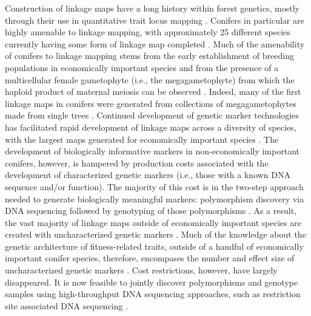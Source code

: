 \documentclass[smallextended]{svjour3}
\begin{document}
Construction of linkage maps have a long history within forest genetics, mostly
through their use in quantitative trait locus mapping
\citep{Ritland:2011}. Conifers in particular are highly amenable to linkage
mapping, with approximately 25 different species currently having some form of
linkage map completed \citep[see Table 5-1 in][]{Ritland:2011}. Much of the
amenability of conifers to linkage mapping stems from the early establishment of
breeding populations in economically important species and from the presence of
a multicellular female gametophyte (i.e., the megagametophyte) from which the
haploid product of maternal meiosis can be observed
\citep{Cairney:2007}. Indeed, many of the first linkage maps in conifers were
generated from collections of megagametophytes made from single trees
\citep{Tulsieram:1992, Nelson:1993, Kubisiak:1996}. Continued development of
genetic marker technologies has facilitated rapid development of linkage maps
across a diversity of species, with the largest maps generated for economically
important species \citep[e.g.][] {Achere:2004, Kang:2010, Martinez-Garcia:2013}.
The development of biologically informative markers in non-economically
important conifers, however, is hampered by production costs associated with the
development of characterized genetic markers (i.e., those with a known DNA
sequence and/or function).  The majority of this cost is in the two-step
approach needed to generate biologically meaningful markers: polymorphism
discovery via DNA sequencing followed by genotyping of those polymorphisms
\citep[cf.,][]{Eckert:2013a}. As a result, the vast majority of linkage maps
outside of economically important species are created with uncharacterized
genetic markers \citep[e.g.,][]{Travis:1998}. Much of the knowledge about the
genetic architecture of fitness-related traits, outside of a handful of
economically important conifer species, therefore, encompases the number and
effect size of uncharacterized genetic markers \citep{Ritland:2011}. Cost
restrictions, however, have largely disappeared.  It is now feasible to jointly
discover polymorphisms and genotype samples using high-throughput DNA sequencing
approaches, such as restriction site associated DNA sequencing \citep [RADseq;
e.g.,][] {Peterson:2012}.
\end{document}
